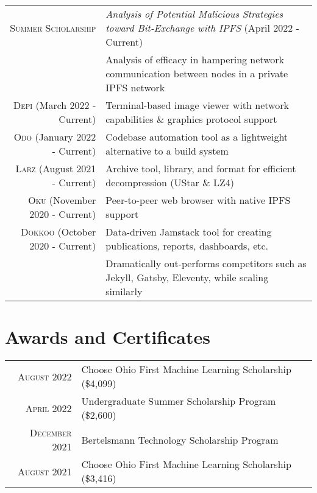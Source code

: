 \documentclass[letterpaper,10pt]{article} %
\begin{document}
{\begin{tabular}{rl}
\footnotesize\textsc{Summer Scholarship} & \footnotesize\emph{Analysis of Potential Malicious Strategies toward Bit-Exchange with IPFS} \footnotesize{(April 2022 - Current)}\\
& \footnotesize{Analysis of efficacy in hampering network communication between nodes in a private IPFS network}\\
\textsc{Depi} \footnotesize{(March 2022 - Current)} & Terminal-based image viewer with network capabilities \& graphics protocol support\\
\textsc{Odo} \footnotesize{(January 2022 - Current)} & Codebase automation tool as a lightweight alternative to a build system\\
\textsc{Larz} \footnotesize{(August 2021 - Current)} & Archive tool, library, and format for efficient decompression (UStar \& LZ4)\\
\textsc{Oku} \footnotesize{(November 2020 - Current)} & Peer-to-peer web browser with native IPFS support\\
\textsc{Dokkoo} \footnotesize{(October 2020 - Current)} & \footnotesize{Data-driven Jamstack tool for creating publications, reports, dashboards, etc.}\\
& \footnotesize{Dramatically out-performs competitors such as Jekyll, Gatsby, Eleventy, while scaling similarly}
\end{tabular}


\section{Awards and Certificates}

\footnotesize{\begin{tabular}{rl}
\textsc{August 2022} & Choose Ohio First Machine Learning Scholarship \footnotesize(\$4,099)\normalsize\\
\textsc{April 2022} & Undergraduate Summer Scholarship Program \footnotesize(\$2,600)\\
\textsc{December 2021} & Bertelsmann Technology Scholarship Program\\
\textsc{August 2021} & Choose Ohio First Machine Learning Scholarship \footnotesize(\$3,416)\normalsize\\
\end{tabular}}\normalsize

}
\end{document}

